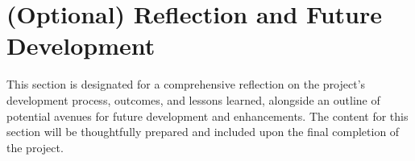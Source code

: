 
\section{(Optional) Reflection and Future Development}
\label{section:reflection} %
This section is designated for a comprehensive reflection on the project's development process, outcomes, and lessons learned, alongside an outline of potential avenues for future development and enhancements. The content for this section will be thoughtfully prepared and included upon the final completion of the project.